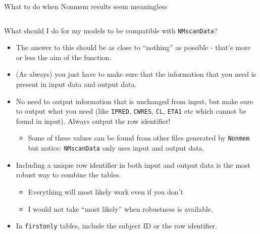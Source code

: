 \documentclass[
  8pt,
  ignorenonframetext,
  aspectratio=169]{beamer}
\providecommand{\tightlist}{%
  \setlength{\itemsep}{0pt}\setlength{\parskip}{0pt}}
\begin{document}
\begin{frame}[fragile]{What to do when Nonmem results seem meaningless}
\begin{columns}[T]
\begin{column}{0.48\textwidth}
\normalsize
\end{column}
\end{columns}
\end{frame}

\begin{frame}[fragile]{What should I do for my models to be compatible
with \texttt{NMscanData}?}
\protect\hypertarget{what-should-i-do-for-my-models-to-be-compatible-with-nmscandata}{}
\begin{itemize}
\item
  The answer to this should be as close to ``nothing'' as possible -
  that's more or less the aim of the function.
\item
  (As always) you just have to make sure that the information that you
  need is present in input data and output data.
\item
  No need to output information that is unchanged from input, but make
  sure to output what you need (like \texttt{IPRED}, \texttt{CWRES},
  \texttt{CL}, \texttt{ETA1} etc which cannot be found in input). Always
  output the row identifier!

  \begin{itemize}
  \tightlist
  \item
    Some of these values can be found from other files generated by
    \texttt{Nonmem} but notice: \texttt{NMscanData} only uses input and
    output data.
  \end{itemize}
\item
  Including a unique row identifier in both input and output data is the
  most robust way to combine the tables.

  \begin{itemize}
  \tightlist
  \item
    Everything will most likely work even if you don't
  \item
    I would not take ``most likely'' when robustness is available.
  \end{itemize}
\item
  In \texttt{firstonly} tables, include the subject ID or the row
  identifier.
\end{itemize}
\end{frame}
\end{document}
